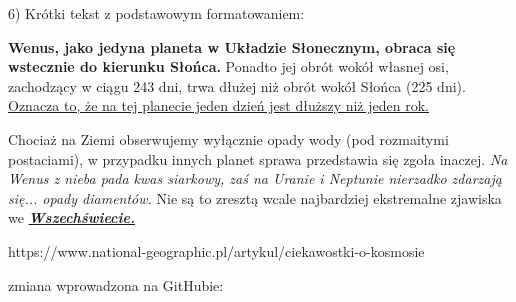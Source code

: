 6) Krótki tekst z podstawowym formatowaniem:

\textbf{Wenus, jako jedyna planeta w Układzie Słonecznym, obraca się wstecznie do kierunku Słońca.} Ponadto jej obrót wokół własnej osi, zachodzący w ciągu 243 dni, trwa dłużej niż obrót wokół Słońca (225 dni). \underline{Oznacza to, że na tej planecie jeden dzień jest dłuższy niż jeden rok.}

Chociaż na Ziemi obserwujemy wyłącznie opady wody (pod rozmaitymi postaciami), w przypadku innych planet sprawa przedstawia się zgoła inaczej. \textit{Na Wenus z nieba pada kwas siarkowy, zaś na Uranie i Neptunie nierzadko zdarzają się... opady diamentów.} Nie są to zresztą wcale najbardziej ekstremalne zjawiska we \textbf{\textit{\underline{Wszechświecie.}}}
 
\begingroup
\raggedleft
https://www.national-geographic.pl/artykul/ciekawostki-o-kosmosie
\endgroup

zmiana wprowadzona na GitHubie: 
